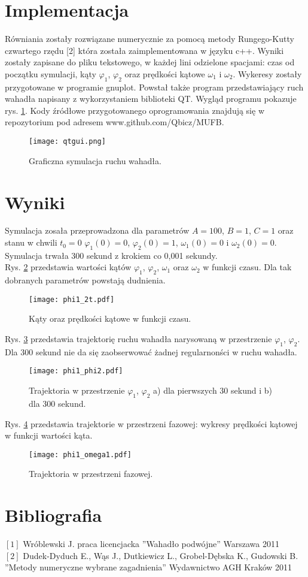 \documentclass[11pt]{aghdpl}
\begin{document}
\section{Implementacja}
Równiania zostały rozwiązane numerycznie za pomocą metody Rungego-Kutty czwartego rzędu [2] która została zaimplementowana w języku c++. Wyniki zostały zapisane do pliku tekstowego, w każdej lini odzielone spacjami: czas od początku symulacji, kąty $\varphi_1$, $\varphi_2$ oraz prędkości kątowe $\omega_1$ i $\omega_2$. Wykeresy zostały przygotowane w programie gnuplot. Powstał także program przedstawiający ruch wahadła napisany z wykorzystaniem biblioteki QT. Wygląd programu pokazuje rys. \ref{QTgui}. Kody źródłowe przygotowanego oprogramowania znajdują się w repozytorium pod adresem www.github.com/Qbicz/MUFB. 

\begin{figure}[h!]
	\centering
	\label{QTgui}
	\texttt{[image: qtgui.png]}
	\caption{Graficzna symulacja ruchu wahadła.}
\end{figure}

\section{Wyniki}
Symulacja zosała przeprowadzona dla parametrów $A = 100$, $B = 1$, $C = 1$ oraz stanu w chwili $t_0=0$ $\varphi_1(0) = 0$, $\varphi_2(0) = 1$, $\omega_1(0) = 0$ i $\omega_2(0) = 0$. Symulacja trwała 300 sekund z krokiem co 0,001 sekundy.  \\
Rys. \ref{phi1_2odt.} przedstawia wartości kątów $\varphi_1$, $\varphi_2$, $\omega_1$ oraz $\omega_2$ w funkcji czasu. Dla tak dobranych parametrów powstają dudnienia.
\begin{figure}[t]
	\centering
	\label{phi1_2odt.}
	\texttt{[image: phi1\_2t.pdf]}
	\caption{Kąty oraz prędkości kątowe w funkcji czasu.}
\end{figure}
Rys. \ref{phi1_phi2.} przedstawia trajektorię ruchu wahadła narysowaną w przestrzenie $\varphi_1$, $\varphi_2$. Dla 300 sekund nie da się zaobserwować żadnej regularnonści w ruchu wahadła.
\begin{figure}[t]
	\centering
	\label{phi1_phi2.}
	\texttt{[image: phi1\_phi2.pdf]}
	\caption{Trajektoria w przestrzenie $\varphi_1$, $\varphi_2$ a) dla pierwszych 30 sekund i b) dla 300 sekund.}
\end{figure}
Rys. \ref{phi_omega} przedstawia trajektorie w przestrzeni fazowej: wykresy prędkości kątowej w funkcji wartości kąta.
\begin{figure}[t]
	\centering
	\label{phi_omega}
	\texttt{[image: phi1\_omega1.pdf]}
	\caption{Trajektoria w przestrzeni fazowej.}
\end{figure}


\section{Bibliografia}
$\qquad$ \\
$[1]$ Wróblewski J. praca licencjacka ''Wahadło podwójne'' Warszawa 2011\\
$[2]$ Dudek-Dyduch E., Wąs J., Dutkiewicz L., Grobel-Dębska K., Gudowski B. ''Metody numeryczne wybrane zagadnienia'' Wydawnictwo AGH Kraków 2011 
\end{document}
